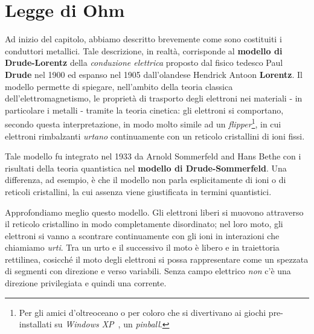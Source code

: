 \section{Legge di Ohm}
Ad inizio del capitolo, abbiamo descritto brevemente come sono costituiti i conduttori metallici. Tale descrizione, in realtà, corrisponde al \textbf{modello di Drude-Lorentz} della \textit{conduzione elettrica} proposto dal fisico tedesco Paul \textbf{Drude} nel 1900 ed espanso nel 1905 dall'olandese Hendrick Antoon \textbf{Lorentz}. Il modello permette di spiegare, nell'ambito della teoria classica dell'elettromagnetismo, le proprietà di trasporto degli elettroni nei materiali - in particolare i metalli - tramite la teoria cinetica: gli elettroni si comportano, secondo questa interpretazione, in modo molto simile ad un \textit{flipper}\footnote{Per gli amici d'oltreoceano o per coloro che si divertivano ai giochi pre-installati su \textit{Windows XP}\texttrademark\ , un \textit{pinball}.}, in cui elettroni rimbalzanti \textit{urtano} continuamente con un reticolo cristallini di ioni fissi.
\begin{digression}
	Tale modello fu integrato nel 1933 da Arnold Sommerfeld and Hans Bethe con i risultati della teoria quantistica nel \textbf{modello di Drude-Sommerfeld}. Una differenza, ad esempio, è che il modello non parla esplicitamente di ioni o di reticoli cristallini, la cui assenza viene giustificata in termini quantistici.
\end{digression}
Approfondiamo meglio questo modello. Gli elettroni liberi si muovono attraverso il reticolo cristallino in modo completamente disordinato; nel loro moto, gli elettroni si vanno a scontrare continuamente con gli ioni in interazioni che chiamiamo \textit{urti}. Tra un urto e il successivo il moto è libero e in traiettoria rettilinea, cosicché il moto degli elettroni si possa rappresentare come un spezzata di segmenti con direzione e verso variabili. Senza campo elettrico \textit{non} c'è una direzione privilegiata e quindi una corrente.

